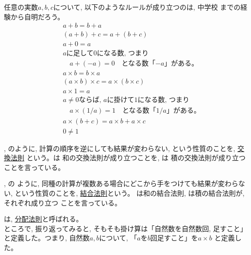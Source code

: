 任意の実数$a, b, c$について, 以下のようなルールが成り立つのは, 中学校
までの経験から自明だろう。
\begin{eqnarray}
&&a+b=b+a\label{eq:axiom_num_sum_exch}\\
&&(a+b)+c=a+(b+c)\label{eq:axiom_num_sum_assoc}\\
&&a+0=a\label{eq:axiom_num_zero}\\
&&a\text{に足して0になる数, つまり}\nonumber\\
&&\quad a+(-a)=0\quad\text{となる数「$-a$」がある。}\label{eq:axiom_num_sum_inv}\\
&&a\times b=b\times a\label{eq:axiom_num_mult_exch}\\
&&(a\times b)\times c=a\times(b\times c)\label{eq:axiom_num_mult_assoc}\\
&&a\times1=a\label{eq:axiom_num_one}\\
&&a\ne0\text{ならば, $a$に掛けて1になる数, つまり}\nonumber\\
&&\quad a\times(1/a)=1\quad\text{となる数「$1/a$」がある。}\label{eq:axiom_num_mult_inv}\\
&&a\times(b+c)=a\times b+a\times c\label{eq:axiom_num_distr}\\
&&0\neq1\label{eq:axiom_num_0neq1}
\end{eqnarray}

, のように, 
計算の順序を逆にしても結果が変わらない, という性質のことを, \underline{交換法則}
という。は
和の交換法則が成り立つことを, は
積の交換法則が成り立つことを言っている。

, の
ように, 同種の計算が複数ある場合にどこから手をつけても結果が変わらない, 
という性質のことを, \underline{結合法則}という。
は和の結合法則, 
は積の結合法則が, それぞれ成り立つ
ことを言っている。

は, \underline{分配法則}と呼ばれる。\\

ところで, 振り返ってみると, そもそも掛け算は「自然数を自然数回, 足すこと」
と定義した。つまり, 自然数$a, b$について, 「$a$を$b$回足すこと」を$a\times b$
と定義した。

